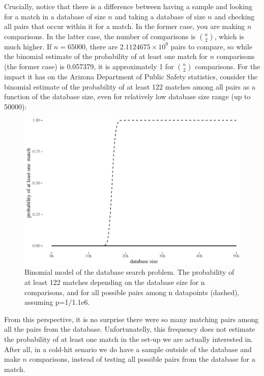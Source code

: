 \documentclass[10pt,dvipsnames,enabledeprecatedfontcommands]{scrartcl}
\begin{document}
Crucially, notice that there is a difference between having a sample and
looking for a match in a database of size \(n\) and taking a database of
size \(n\) and checking all pairs that occur within it for a match. In
the former case, you are making \(n\) comparisons. In the latter case,
the number of comparisons is \({n \choose 2}\), which is much higher. If
\(n=65000\), there are \ensuremath{2.1124675\times 10^{9}} pairs to
compare, so while the binomial estimate of the probability of at least
one match for \(n\) comparisons (the former case) is 0.057379, it is
approximately 1 for \({n \choose 2}\) comparisons. For the impact it has
on the Arizona Department of Public Safety statistics, consider the
binomial estimate of the probability of at least 122 matches among all
pairs as a function of the database size, even for relatively low
database size range (up to 50000):

\begin{figure}

{\centering \includegraphics[width=1\linewidth]{lr-chapter_files/figure-latex/unnamed-chunk-5-1} 

}

\caption{Binomial model of the database search problem. The probability of at least 122 matches depending on the database size for n comparisons, and for all possible pairs among n datapoints (dashed), assuming p=1/1.1e6.}\label{fig:unnamed-chunk-5}
\end{figure}

From this perspective, it is no surprise there were so many matching
pairs among all the pairs from the database. Unfortunatelly, this
frequency does not estimate the probability of at least one match in the
set-up we are actually interested in. After all, in a cold-hit senario
we do have a sample outside of the database and make \(n\) comparisons,
instead of testing all possible pairs from the database for a match.
\end{document}
